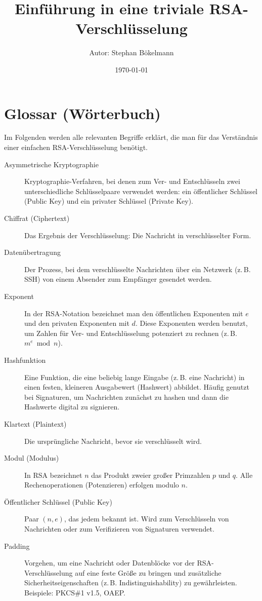 \documentclass[a4paper,11pt]{article}
\title{Einführung in eine triviale RSA-Verschlüsselung}
\author{Autor: Stephan Bökelmann}
\date{\today}
\begin{document}
\maketitle
\tableofcontents
\newpage

\section{Glossar (Wörterbuch)}
Im Folgenden werden alle relevanten Begriffe erklärt, die man für das Verständnis einer einfachen RSA-Verschlüsselung benötigt.

\begin{description}
  \item[Asymmetrische Kryptographie] Kryptographie-Verfahren, bei denen zum Ver- und Entschlüsseln zwei unterschiedliche Schlüsselpaare verwendet werden: ein öffentlicher Schlüssel (Public Key) und ein privater Schlüssel (Private Key).
  \item[Chiffrat (Ciphertext)] Das Ergebnis der Verschlüsselung: Die Nachricht in verschlüsselter Form.
  \item[Datenübertragung] Der Prozess, bei dem verschlüsselte Nachrichten über ein Netzwerk (z.\,B. SSH) von einem Absender zum Empfänger gesendet werden.
  \item[Exponent] In der RSA-Notation bezeichnet man den öffentlichen Exponenten mit \(e\) und den privaten Exponenten mit \(d\). Diese Exponenten werden benutzt, um Zahlen für Ver- und Entschlüsselung potenziert zu rechnen (z.\,B. \(m^e \bmod n\)).
  \item[Hashfunktion] Eine Funktion, die eine beliebig lange Eingabe (z.\,B. eine Nachricht) in einen festen, kleineren Ausgabewert (Hashwert) abbildet. Häufig genutzt bei Signaturen, um Nachrichten zunächst zu hashen und dann die Hashwerte digital zu signieren.
  \item[Klartext (Plaintext)] Die ursprüngliche Nachricht, bevor sie verschlüsselt wird.
  \item[Modul (Modulus)] In RSA bezeichnet \(n\) das Produkt zweier großer Primzahlen \(p\) und \(q\). Alle Rechenoperationen (Potenzieren) erfolgen modulo \(n\).
  \item[Öffentlicher Schlüssel (Public Key)] Paar \((n, e)\), das jedem bekannt ist. Wird zum Verschlüsseln von Nachrichten oder zum Verifizieren von Signaturen verwendet.
  \item[Padding] Vorgehen, um eine Nachricht oder Datenblöcke vor der RSA-Verschlüsselung auf eine feste Größe zu bringen und zusätzliche Sicherheitseigenschaften (z.\,B. Indistinguishability) zu gewährleisten. Beispiele: PKCS\#1 v1.5, OAEP.

\end{description}
\end{document}

